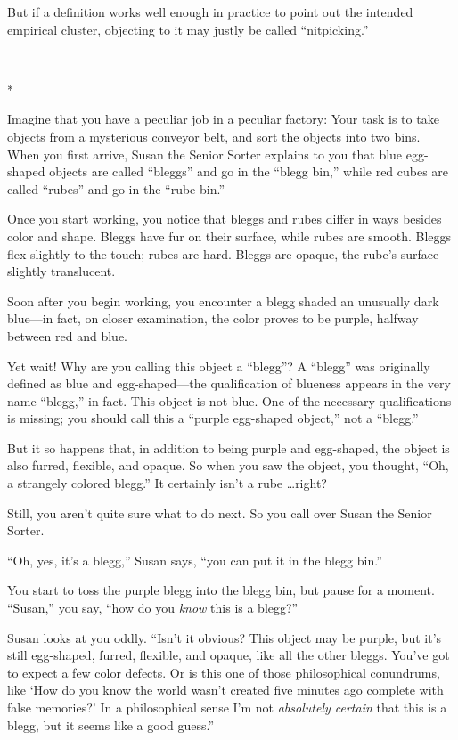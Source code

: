 {
 But if a definition works well enough in practice to point out the
intended empirical cluster, objecting to it may justly be called
``nitpicking.''}

{\centering
 \ ~
\par}

{\centering
 *
\par}


{
 Imagine that you have a peculiar job in a peculiar factory: Your
task is to take objects from a mysterious conveyor belt, and sort the
objects into two bins. When you first arrive, Susan the Senior Sorter
explains to you that blue egg-shaped objects are called
``bleggs'' and go in the
``blegg bin,'' while red cubes are
called ``rubes'' and go in the
``rube bin.'' }

{
 Once you start working, you notice that bleggs and rubes differ in
ways besides color and shape. Bleggs have fur on their surface, while
rubes are smooth. Bleggs flex slightly to the touch; rubes are hard.
Bleggs are opaque, the rube's surface slightly
translucent.}

{
 Soon after you begin working, you encounter a blegg shaded an
unusually dark blue---in fact, on closer examination, the color proves
to be purple, halfway between red and blue.}

{
 Yet wait! Why are you calling this object a
``blegg''? A
``blegg'' was originally defined as
blue and egg-shaped---the qualification of blueness appears in the very
name ``blegg,'' in fact. This object
is not blue. One of the necessary qualifications is missing; you should
call this a ``purple egg-shaped
object,'' not a
``blegg.''}

{
 But it so happens that, in addition to being purple and
egg-shaped, the object is also furred, flexible, and opaque. So when
you saw the object, you thought, ``Oh, a strangely
colored blegg.'' It certainly isn't a
rube \ldots right?}

{
 Still, you aren't quite sure what to do next. So
you call over Susan the Senior Sorter.}

{
 ``Oh, yes, it's a
blegg,'' Susan says, ``you can put
it in the blegg bin.''}

{
 You start to toss the purple blegg into the blegg bin, but pause
for a moment. ``Susan,'' you say,
``how do you \textit{know} this is a
blegg?''}

{
 Susan looks at you oddly. ``Isn't
it obvious? This object may be purple, but it's still
egg-shaped, furred, flexible, and opaque, like all the other bleggs.
You've got to expect a few color defects. Or is this
one of those philosophical conundrums, like `How do you
know the world wasn't created five minutes ago complete
with false memories?' In a philosophical sense
I'm not \textit{absolutely certain} that this is a
blegg, but it seems like a good guess.''}


